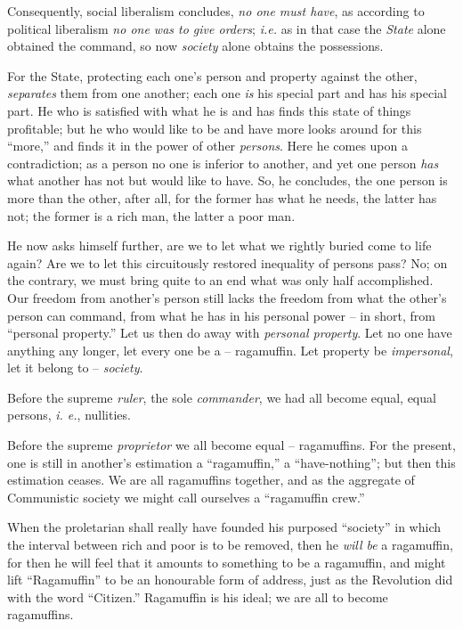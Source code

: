 \documentclass[12pt,a4paper]{book}
\begin{document}
Consequently, social liberalism concludes, \textit{no one must have}, as 
according to political liberalism \textit{no one was to give orders}; 
\textit{i.e.} as in that case the \textit{State} alone obtained the command, 
so now \textit{society} alone obtains the possessions.

For the State, protecting each one's person and property against the other, 
\textit{separates} them from one another; each one \textit{is} his special 
part and has his special part. He who is satisfied with what he is and has 
finds this state of things profitable; but he who would like to be and have 
more looks around for this ``more,'' and finds it in the power of other 
\textit{persons}. Here he comes upon a contradiction; as a person no one is 
inferior to another, and yet one person \textit{has} what another has not but 
would like to have. So, he concludes, the one person is more than the other, 
after all, for the former has what he needs, the latter has not; the former is 
a rich man, the latter a poor man.

He now asks himself further, are we to let what we rightly buried come to life 
again? Are we to let this circuitously restored inequality of persons pass? 
No; on the contrary, we must bring quite to an end what was only half 
accomplished. Our freedom from another's person still lacks the freedom from 
what the other's person can command, from what he has in his personal power -- 
in short, from ``personal property.'' Let us then do away with 
\textit{personal property}. Let no one have anything any longer, let every one 
be a -- ragamuffin. Let property be \textit{impersonal}, let it belong to -- 
\textit{society}.

Before the supreme \textit{ruler}, the sole \textit{commander}, we had all 
become equal, equal persons, \textit{i. e.}, nullities.

Before the supreme \textit{proprietor} we all become equal -- ragamuffins. For 
the present, one is still in another's estimation a ``ragamuffin,'' a 
``have-nothing''; but then this estimation ceases. We are all ragamuffins 
together, and as the aggregate of Communistic society we might call ourselves 
a ``ragamuffin crew.''

When the proletarian shall really have founded his purposed ``society'' in 
which the interval between rich and poor is to be removed, then he 
\textit{will be} a ragamuffin, for then he will feel that it amounts to 
something to be a ragamuffin, and might lift ``Ragamuffin'' to be an 
honourable form of address, just as the Revolution did with the word 
``Citizen.'' Ragamuffin is his ideal; we are all to become ragamuffins.
\end{document}
